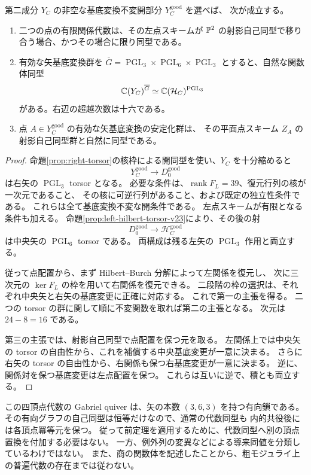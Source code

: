 \begin{theorem}[二十一点配置による関係代数の復元]
\label{thm:point-configuration-torelli-v23}
第二成分 $Y_C$ の非空な基底変換不変開部分 $Y_C^{\mathrm{good}}$ を選べば、
次が成立する。
\begin{enumerate}
\item 二つの点の有限関係代数は、その左点スキームが
$\mathbb P^2$ の射影自己同型で移り合う場合、かつその場合に限り同型である。
\item 有効な矢基底変換群を
$\overline G=\operatorname{PGL}_3\times\operatorname{PGL}_6\times\operatorname{PGL}_3$
とすると、自然な関数体同型
\[
 \mathbb C(Y_C)^{\overline G}
 \simeq\mathbb C(\mathcal H_C)^{\operatorname{PGL}_3}
\]
がある。右辺の超越次数は十六である。
\item 点 $A\in Y_C^{\mathrm{good}}$ の有効な矢基底変換の安定化群は、
その平面点スキーム $Z_A$ の射影自己同型群と自然に同型である。
\end{enumerate}
\end{theorem}
\begin{proof}
命題\ref{prop:right-torsor}の核枠による開同型を使い、$Y_C$ を十分縮めると
\[
 Y_C^{\mathrm{good}}\longrightarrow D_0^{\mathrm{good}}
\]
は右矢の $\operatorname{PGL}_3$ torsor となる。
必要な条件は、$\operatorname{rank}F_L=39$、復元行列の核が一次元であること、
その核に可逆行列があること、および既定の独立性条件である。
これらは全て基底変換不変な開条件である。
左点スキームが有限となる条件も加える。
命題\ref{prop:left-hilbert-torsor-v23}により、その後の射
\[
 D_0^{\mathrm{good}}\longrightarrow\mathcal H_C^{\mathrm{good}}
\]
は中央矢の $\operatorname{PGL}_6$ torsor である。
両構成は残る左矢の $\operatorname{PGL}_3$ 作用と両立する。

従って点配置から、まず Hilbert--Burch 分解によって左関係を復元し、
次に三次元の $\ker F_L$ の枠を用いて右関係を復元できる。
二段階の枠の選択は、それぞれ中央矢と右矢の基底変更に正確に対応する。
これで第一の主張を得る。
二つの torsor の群に関して順に不変関数を取れば第二の主張となる。
次元は $24-8=16$ である。

第三の主張では、射影自己同型で点配置を保つ元を取る。
左関係上では中央矢の torsor の自由性から、これを補償する中央基底変更が一意に決まる。
さらに右矢の torsor の自由性から、右関係も保つ右基底変更が一意に決まる。
逆に、関係対を保つ基底変更は左点配置を保つ。
これらは互いに逆で、積とも両立する。
\end{proof}

\begin{remark}[同型と導来同値の範囲]
この四頂点代数の Gabriel quiver は、矢の本数 $(3,6,3)$ を持つ有向鎖である。
その有向グラフの自己同型は恒等だけなので、通常の代数同型も
内的共役後には各頂点冪等元を保つ。
従って前定理を適用するために、代数同型へ別の頂点置換を付加する必要はない。
一方、例外列の変異などによる導来同値を分類しているわけではない。
また、商の関数体を記述したことから、粗モジュライ上の普遍代数の存在までは従わない。
\end{remark}


